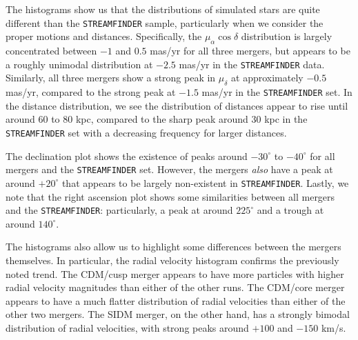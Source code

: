 The histograms show us that the distributions of simulated stars are quite
different than the \verb|STREAMFINDER| sample, particularly when we consider
the proper motions and distances. Specifically, the $\mu_\alpha \cos\delta$
distribution is largely concentrated between $-1$ and $0.5$ mas/yr for all
three mergers, but appears to be a roughly unimodal distribution at $-2.5$
mas/yr in the \verb|STREAMFINDER| data.  Similarly, all three mergers show a
strong peak in $\mu_\delta$ at approximately $-0.5$ mas/yr, compared to the
strong peak at $-1.5$ mas/yr in the \verb|STREAMFINDER| set. In the distance
distribution, we see the distribution of distances appear to rise until around
60 to 80 kpc, compared to the sharp peak around 30 kpc in the
\verb|STREAMFINDER| set with a decreasing frequency for larger distances.

The declination plot shows the existence of peaks around $-30^\circ$ to
$-40^\circ$ for all mergers and the \verb|STREAMFINDER| set. However, the
mergers \textit{also} have a peak at around $+20^\circ$ that appears to be
largely non-existent in \verb|STREAMFINDER|.  Lastly, we note that the right
ascension plot shows some similarities between all mergers and the
\verb|STREAMFINDER|: particularly, a peak at around $225^\circ$ and a trough
at around $140^\circ$.

The histograms also allow us to highlight some differences between the mergers
themselves. In particular, the radial velocity histogram confirms the previously
noted trend. The CDM/cusp merger appears to have more particles with higher
radial velocity magnitudes than either of the other runs. The CDM/core merger
appears to have a much flatter distribution of radial velocities than either of
the other two mergers. The SIDM merger, on the other hand, has a strongly
bimodal distribution of radial velocities, with strong peaks around $+100$ and
$-150$ km/s.

